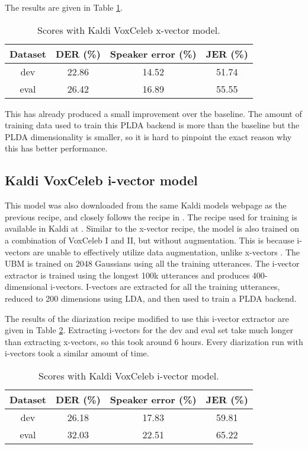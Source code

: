 			The results are given in Table \ref{table-kaldi-xvec}.
	
			\begin{table}[h]
			\centering
			\begin{tabular}{|c|c|c|c|}
				\hline
				Dataset & DER (\%) & Speaker error (\%) & JER (\%) \\
				\hline
				dev & 22.86 & 14.52 & 51.74 \\
				\hline
				eval & 26.42 & 16.89 & 55.55 \\
				\hline
			\end{tabular}
			\caption{Scores with Kaldi VoxCeleb x-vector model.}
			\label{table-kaldi-xvec}
			\end{table}
		
			This has already produced a small improvement over the baseline. The amount of training data used to train this PLDA backend is more than the baseline but the PLDA dimensionality is smaller, so it is hard to pinpoint the exact reason why this has better performance.
		
		\subsection{Kaldi VoxCeleb i-vector model}
			This model was also downloaded from the same Kaldi models webpage as the previous recipe, and closely follows the recipe in \cite{snyder2018x}. The recipe used for training is available in Kaldi at . Similar to the x-vector recipe, the model is also trained on a combination of VoxCeleb I and II, but without augmentation. This is because i-vectors are unable to effectively utilize data augmentation, unlike x-vectors \cite{snyder2018x}. The UBM is trained on 2048 Gaussians using all the training utterances. The i-vector extractor is trained using the longest 100k utterances and produces 400-dimensional i-vectors. I-vectors are extracted for all the training utterances, reduced to 200 dimensions using LDA, and then used to train a PLDA backend.
			
			The results of the diarization recipe modified to use this i-vector extractor are given in Table \ref{table-kaldi-ivec}. Extracting i-vectors for the dev and eval set take much longer than extracting x-vectors, so this took around 6 hours. Every diarization run with i-vectors took a similar amount of time.
			
			\begin{table}[h]
				\centering
				\begin{tabular}{|c|c|c|c|}
					\hline
					Dataset & DER (\%) & Speaker error (\%) & JER (\%) \\
					\hline
					dev & 26.18 & 17.83 & 59.81 \\
					\hline
					eval & 32.03 & 22.51 & 65.22 \\
					\hline
				\end{tabular}
				\caption{Scores with Kaldi VoxCeleb i-vector model.}
				\label{table-kaldi-ivec}
			\end{table}
		

